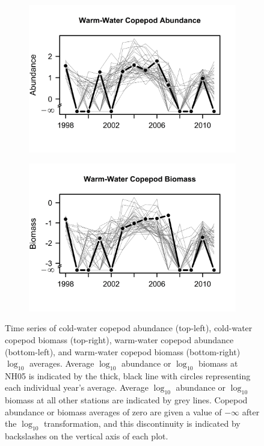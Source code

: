 \documentclass[preprint, authoryear, 12pt]{elsarticle}
\begin{document}
\begin{figure}
\begin{subfigure}{0.45\textwidth}
  \includegraphics[width = 1\linewidth]{images/so_abu.jpg}
  \caption{}
  \label{fig:warm_abu}
\end{subfigure}
\begin{subfigure}{0.45\textwidth}
  \centering
  \includegraphics[width = 1\linewidth]{images/so_bio.jpg}
  \caption{}
  \label{fig:warm_bio}
\end{subfigure}
\caption{Time series of cold-water copepod abundance (top-left), cold-water copepod biomass (top-right), warm-water copepod abundance (bottom-left), and warm-water copepod biomass (bottom-right) $\log_{10}$ averages. Average $\log_{10}$ abundance or $\log_{10}$ biomass at NH05 is indicated by the thick, black line with circles representing each individual year's average. Average $\log_{10}$ abundance or $\log_{10}$ biomass at all other stations are indicated by grey lines. Copepod abundance or biomass averages of zero are given a value of $-\infty$ after the $\log_{10}$ transformation, and this discontinuity is indicated by backslashes on the vertical axis of each plot.}
\label{fig:cope_ts}
\end{figure}
\end{document}
